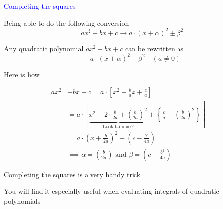 \documentclass[14pt,fleqn]{extarticle}
\begin{document}
 
\begin{skill}
\textcolor{blue}{Completing the squares}

Being able to do the following conversion
\small\[ \quad ax^2 + bx + c \longrightarrow a\cdot \left(x + \alpha \right)^2 \pm \beta^2 \]\normalsize 
\end{skill}

\newcard 

\underline{Any quadratic polynomial} $ax^2 + bx + c$ can be rewritten as 
\[ \qquad a\cdot \left(x + \alpha \right)^2 + \beta^2\quad \left(a \neq 0 \right)\] 

Here is how 

\begin{align}
	ax^2 &+ bx + c = a\cdot \left[x^2 + \frac{b}{a} x + \frac{c}{a} \right] \\
	&= a\cdot \left[\underbrace{x^2 + 2\cdot \frac{b}{2a} + \left(\frac{b}{2a} \right)^2}_{\text{Look familiar?}} + \left \lbrace \frac{c}{a} - \left(\frac{b}{2a} \right)^2\right\rbrace  \right] \\
	&= a\cdot \left(x + \frac{b}{2a} \right)^2 + \left(c-\frac{b^2}{4a} \right) \\
	&\implies \alpha = \left(\frac{b}{2a} \right)\text{ and } \beta = \left(c-\frac{b^2}{4a} \right)
\end{align}


Completing the squares is a \underline{very handy trick}\newline 

You will find it especially useful when evaluating integrals of quadratic polynomials 
\end{document}

